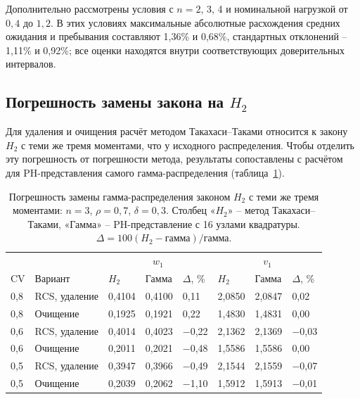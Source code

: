 \documentclass[a4paper,12pt]{article}
\begin{document}
Дополнительно рассмотрены условия с \(n=2\), 3, 4 и номинальной нагрузкой от \(0{,}4\) до \(1{,}2\). В этих условиях максимальные абсолютные расхождения средних ожидания и пребывания составляют 1,36\% и 0,68\%, стандартных отклонений -- 1,11\% и 0,92\%; все оценки находятся внутри соответствующих доверительных интервалов.

\subsection{Погрешность замены закона на \(H_2\)}\label{sec:law}
Для удаления и очищения расчёт методом Такахаси--Таками относится к закону \(H_2\) с теми же тремя моментами, что у исходного распределения. Чтобы отделить эту погрешность от погрешности метода, результаты сопоставлены с расчётом для PH-представления самого гамма-распределения (таблица~\ref{tab:law}).

\begin{table}[!htbp]
\centering\small\setlength{\tabcolsep}{3pt}
\begin{tabular}{@{}p{1.0cm}p{3.2cm}p{1.6cm}p{1.6cm}p{1.3cm}p{1.6cm}p{1.6cm}p{1.3cm}@{}}
\toprule
 & & \multicolumn{3}{c}{$w_1$} & \multicolumn{3}{c}{$v_1$} \\
$\mathrm{CV}$ & Вариант & $H_2$ & Гамма & $\Delta$, \% & $H_2$ & Гамма & $\Delta$, \% \\
\midrule
0,8 & RCS, удаление & 0,4104 & 0,4100 & 0,11 & 2,0850 & 2,0847 & 0,02 \\
0,8 & Очищение & 0,1925 & 0,1921 & 0,22 & 1,4830 & 1,4831 & 0,00 \\
0,6 & RCS, удаление & 0,4014 & 0,4023 & −0,22 & 2,1362 & 2,1369 & −0,03 \\
0,6 & Очищение & 0,2011 & 0,2021 & −0,48 & 1,5586 & 1,5586 & 0,00 \\
0,5 & RCS, удаление & 0,3947 & 0,3966 & −0,49 & 2,1544 & 2,1559 & −0,07 \\
0,5 & Очищение & 0,2039 & 0,2062 & −1,10 & 1,5912 & 1,5913 & −0,01 \\
\bottomrule
\end{tabular}
\caption{Погрешность замены гамма-распределения законом \(H_2\) с теми же тремя моментами: \(n=3\), \(\rho=0{,}7\), \(\delta=0{,}3\). Столбец «\(H_2\)» -- метод Такахаси--Таками, «Гамма» -- PH-представление с 16 узлами квадратуры. \(\Delta=100(H_2-\text{гамма})/\text{гамма}\).}
\label{tab:law}
\end{table}
\end{document}
